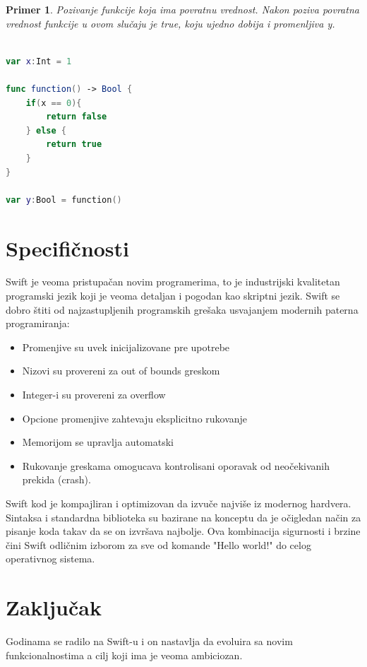 \documentclass[a4paper]{article}
\newtheorem{primer}{Primer}[section]
\begin{document}
\begin{primer}
Pozivanje funkcije koja ima povratnu vrednost. Nakon poziva povratna vrednost funkcije u ovom slučaju je true, koju ujedno dobija i promenljiva y.
\end{primer}

\begin{lstlisting}[language=Swift, caption={Funkcije sa povratnom vrednosti},frame=single, label=simple]

var x:Int = 1

func function() -> Bool {
	if(x == 0){
		return false
	} else {
		return true
	}
}

var y:Bool = function()

\end{lstlisting}






\section{Specifičnosti}	
\label{sec:sedmiDeo}

Swift je veoma pristupačan novim programerima, to je industrijski kvalitetan programski jezik koji je veoma detaljan i pogodan kao skriptni jezik. Swift se dobro štiti od najzastupljenih programskih grešaka usvajanjem modernih paterna programiranja:
\begin{itemize}
\item Promenjive su uvek inicijalizovane pre upotrebe
\item Nizovi su provereni za out of bounds greskom
\item Integer-i su provereni za overflow
\item Opcione promenjive zahtevaju eksplicitno rukovanje
\item Memorijom se upravlja automatski
\item Rukovanje greskama omogucava kontrolisani oporavak od neočekivanih prekida (crash).
\end{itemize}

Swift kod je kompajliran i optimizovan da izvuče najviše iz modernog hardvera. Sintaksa i standardna biblioteka su bazirane na konceptu da je očigledan način za pisanje koda takav da se on izvršava najbolje. Ova kombinacija sigurnosti i brzine čini Swift odličnim izborom za sve od komande "Hello world!" do celog operativnog sistema.

\section{Zaključak}
\label{sec:zakljucak}
Godinama se radilo na Swift-u i on nastavlja da evoluira  sa novim funkcionalnostima a cilj koji ima je veoma ambiciozan.

\appendix
 


\appendix
\end{document}
